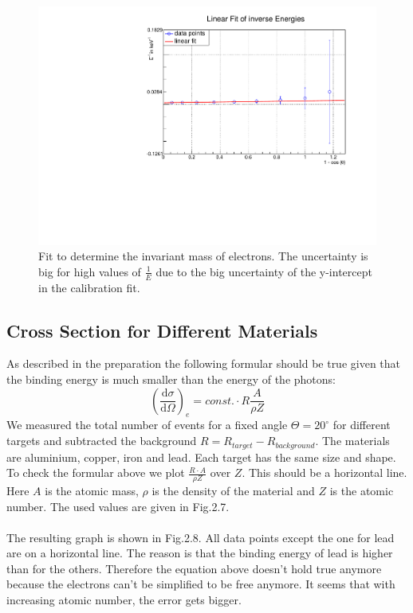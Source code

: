 \begin{figure}
\centering
\includegraphics[scale=0.5]{./../plots/inv_el_mass.pdf}
\caption{Fit to determine the invariant mass of electrons. The uncertainty is big for high values of $\frac{1}{E}$ due to the big uncertainty of the y-intercept in the calibration fit.}
\end{figure}


\subsection{Cross Section for Different Materials}

As described in the preparation the following formular should be true given that the binding energy is much smaller than the energy of the photons:
$$(\frac{\mathrm{d}\sigma}{\mathrm{d}\Omega})_e = const. \cdot R \frac{A}{\rho Z} $$
We measured the total number of events for a fixed angle $\Theta = 20 ^{\circ}$ for different targets and subtracted the background $R = R_{target} - R_{background}$. The materials are aluminium, copper, iron and lead. Each target has the same size and shape. \\
To check the formular above we plot $\frac{R \cdot A}{\rho Z}$ over $Z$. This should be a horizontal line. Here $A$ is the atomic mass, $\rho$ is the density of the material and $Z$ is the atomic number. The used values are given in Fig.2.7.\\
\\
The resulting graph is shown in Fig.2.8. All data points except the one for lead are on a horizontal line. The reason is that the binding energy of lead is higher than for the others. Therefore the equation above doesn't hold true anymore because the electrons can't be simplified to be free anymore. It seems that with increasing atomic number, the error gets bigger. 

